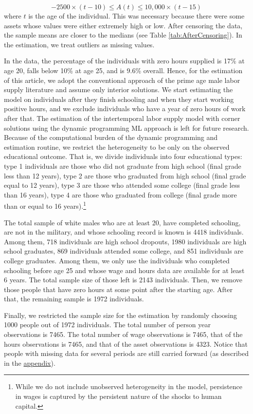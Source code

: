 \documentclass[\econtexRoot/ImaiKeane]{subfiles}
\begin{document}
 $$ -2500 \times (t-10) \leq A(t) \leq 10,000 \times (t-15)$$
 where $t$ is the age of the individual. This was necessary because there were some assets whose values were either extremely high or low. After censoring the data, the sample means are closer to the medians (see Table \ref{tab:AfterCensoring}). In the estimation, we treat outliers as missing values. \par
 
 In the data, the percentage of the individuals with zero hours supplied is 17\% at age 20, falls below 10\% at age 25, and is 9.6\% overall. Hence, for the estimation of this article, we adopt the conventional approach of the prime age male labor supply literature and assume only interior solutions. We start estimating the model on individuals after they finish schooling and when they start working positive hours, and we exclude individuals who have a year of zero hours of work after that. The estimation of the intertemporal labor supply model with corner solutions using the dynamic programming ML approach is left for future research. Because of the computational burden of the dynamic programming and estimation routine, we restrict the heterogeneity to be only on the observed educational outcome. That is, we divide individuals into four educational types: type 1 individuals are those who did not graduate from high school (final grade less than 12 years), type 2 are those who graduated from high school (final grade equal to 12 years), type 3 are those who attended some college (final grade less than 16 years), type 4 are those who graduated from college (final grade more than or equal to 16 years).\footnote[10]{While we do not include unobserved heterogeneity in the model, persistence in wages is captured by the persistent nature of the shocks to human capital.} \par

 The total sample of white males who are at least 20, have completed schooling, are not in the military, and whose schooling record is known is 4418 individuals. Among them, 718 individuals are high school dropouts, 1980 individuals are high school graduates, 869 individuals attended some college, and 851 individuals are college graduates. Among them, we only use the individuals who completed schooling before age 25 and whose wage and hours data are available for at least 6 years. The total sample size of those left is 2143 individuals. Then, we remove those people that have zero hours at some point after the starting age. After that, the remaining sample is 1972 individuals. \par
Finally, we restricted the sample size for the estimation by randomly choosing 1000 people out of 1972 individuals. The total number of person year observations is 7465. The total number of wage observations is 7465, that of the hours observations is 7465, and that of the asset observations is 4323. Notice that people with missing data for several periods are still carried forward (as described in the \hyperref[appendix]{appendix}).
\end{document}
